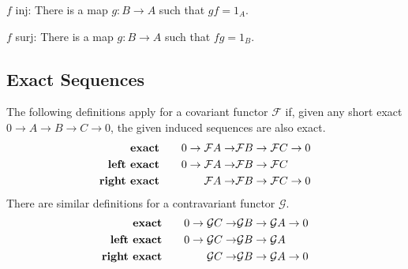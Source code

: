 \documentclass[twoside,10pt]{report}
\begin{document}

{\color{blue}
	$f$ inj: There is a map $g:B\to A$ such that $gf = 1_{A}$.

	$f$ surj: There is a map $g:B\to A$ such that $fg = 1_{B}$.
}


\subsection{Exact Sequences}

\begin{defn}[]
The following definitions apply for a covariant functor $\mathcal{F}$ if, given any short exact $0\to A\to B\to C\to 0$, the given induced sequences are also exact.
\begin{equation*}
        \begin{aligned}[c]
                \text{\textbf{exact}} \\
                \text{\textbf{left exact}} \\
                \text{\textbf{right exact}}
        \end{aligned}
        \qquad
        \begin{aligned}[c]
                0\to \mathcal{F}A\to &\mathcal{F}B\to \mathcal{F}C\to 0\\
                0\to \mathcal{F}A\to &\mathcal{F}B\to \mathcal{F}C\\
                \mathcal{F}A\to &\mathcal{F}B\to \mathcal{F}C\to 0
        \end{aligned}
\end{equation*}
There are similar definitions for a contravariant functor $\mathcal{G}$.
\begin{equation*}
        \begin{aligned}[c]
                \text{\textbf{exact}} \\
                \text{\textbf{left exact}} \\
                \text{\textbf{right exact}}
        \end{aligned}
        \qquad
        \begin{aligned}[c]
                0\to \mathcal{G}C\to &\mathcal{G}B\to \mathcal{G}A\to 0\\
                0\to \mathcal{G}C\to &\mathcal{G}B\to \mathcal{G}A\\
                \mathcal{G}C\to &\mathcal{G}B\to \mathcal{G}A\to 0
        \end{aligned}
\end{equation*}
\end{defn}
\end{document}
